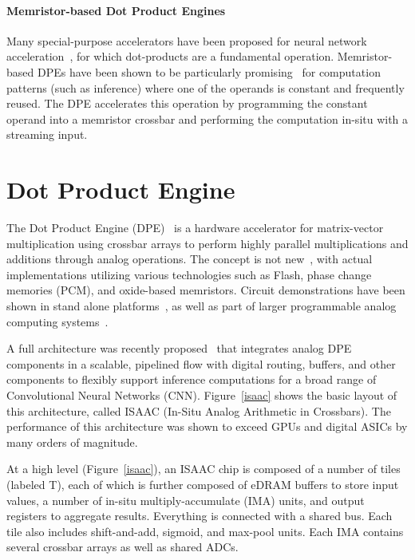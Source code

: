 \paragraph{Memristor-based Dot Product Engines} Many special-purpose
accelerators have been proposed for neural network
acceleration~\cite{chen2014dadiannao,chi2016prime,shafiee2016isaac}, for which
dot-products are a fundamental operation.  Memristor-based DPEs have been shown
to be particularly promising~\cite{shafiee2016isaac} for computation patterns
(such as inference) where one of the operands is constant and frequently
reused.  The DPE accelerates this operation by programming the constant operand
into a memristor crossbar and performing the computation in-situ with a
streaming input.

\section{Dot Product Engine}
\label{sec:DPE}

The Dot Product Engine (DPE)~\cite{hu2016dot} is a hardware accelerator for
matrix-vector multiplication using crossbar arrays to perform highly parallel
multiplications and additions through analog operations.  The concept is not
new~\cite{steinbuch1961lernmatrix,likharev2011crossnets}, with actual
implementations utilizing various technologies such as Flash, phase change
memories (PCM), and oxide-based memristors.  Circuit demonstrations have been
shown in stand alone platforms~\cite{prezioso2015training}, as well as part of
larger programmable analog computing systems~\cite{george2016programmable}.

A full architecture was recently proposed~\cite{shafiee2016isaac} that
integrates analog DPE components in a scalable, pipelined flow with digital
routing, buffers, and other components to flexibly support inference
computations for a broad range of Convolutional Neural Networks (CNN).
Figure~\ref{isaac} shows the basic layout of this architecture, called ISAAC
(In-Situ Analog Arithmetic in Crossbars).  The performance of this architecture
was shown to exceed GPUs and digital ASICs by many orders of magnitude.

At a high level (Figure~\ref{isaac}), an ISAAC chip is composed of a number of
tiles (labeled T), each of which is further composed of eDRAM buffers to store
input values, a number of in-situ multiply-accumulate (IMA) units, and output
registers to aggregate results.  Everything is connected with a shared bus.
Each tile also includes shift-and-add, sigmoid, and max-pool units.  Each IMA
contains several crossbar arrays as well as shared ADCs.


